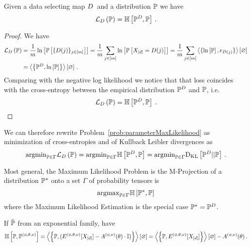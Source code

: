 \begin{lemma}
	Given a data selecting map $D$ and a distribution $\mathbb{P}$ we have
	\begin{align}
		\lossof{\probtensor} =  \centropyof{\empdistribution}{\probtensor} \, . %
	\end{align}
\end{lemma}
\begin{proof}
	We have
	\begin{align*}
		\lossof{\probtensor} 
		& = \frac{1}{\datanum} \lnof{\probof{\data}} 
		= \frac{1}{\datanum} \sum_{\datain} \lnof{\probof{\shortcatvariables =\datamap(\dataindex)}} 
		= \frac{1}{\datanum} \sum_{\datain} \contraction{\{\lnof{\probtensor},\onehotmapof{\datamap(\dataindex)}\}} \\ 
		& = \sbcontraction{\empdistribution,\lnof{\probtensor}} \, .
	\end{align*}
	Comparing with the negative log likelihood we notice that that loss coincides with the cross-entropy between the empirical distribution $\mathbb{P}^{D}$ and $\mathbb{P}$, i.e.
		\[ \mathcal{L}_{D}\left(\mathbb{P}\right) = \mathbb{H}\left[\mathbb{P}^{D},\mathbb{P}\right] \, . \]
\end{proof}



We can therefore rewrite Problem~\ref{prob:parameterMaxLikelihood} as minimization of cross-entropies and of Kullback Leibler divergences as
\begin{align*}
	\mathrm{argmin}_{\mathbb{P}\in\Gamma} \mathcal{L}_{D}\left(\mathbb{P}\right) 
	= \mathrm{argmin}_{\mathbb{P}\in\Gamma} \mathbb{H}\left[\mathbb{P}^{D},\mathbb{P}\right] 
	= \mathrm{argmin}_{\mathbb{P}\in\Gamma} \mathrm{D}_{\mathrm{KL}}\left[ \mathbb{P}^{D} || \mathbb{P} \right] \, .
\end{align*}
	


Most general, the Maximum Likelihood Problem is the M-Projection of a distribution $\mathbb{P}^*$ onto a set $\Gamma$ of probability tensors is
\begin{align}
	\mathrm{argmax}_{\mathbb{P}\in\Gamma} \mathbb{H}\left[\mathbb{P}^*,\mathbb{P}\right] 
\end{align}
where the Maximum Likelihood Estimation is the special case $\mathbb{P}^*=\mathbb{P}^{D}$.


\begin{example}
	If $\tilde{\mathbb{P}}$ from an exponential family, have
		\[ \mathbb{H}\left[\mathbb{P},\mathbb{P}^{(\phi,\theta,\nu)}\right] 
		= \left\langle \left\{\mathbb{P},(E^{(\phi,\theta,\nu)}[X_{[d]}]-A^{(\phi,\nu)}(\theta)\cdot \mathbb{I})\right\}\right\rangle \left[ \varnothing \right]
		=   \left\langle \left\{\mathbb{P},E^{(\phi,\theta,\nu)}[X_{[d]}]\right\}\right\rangle \left[ \varnothing \right] -A^{(\phi,\nu)}(\theta) \, .   \]
\end{example}





